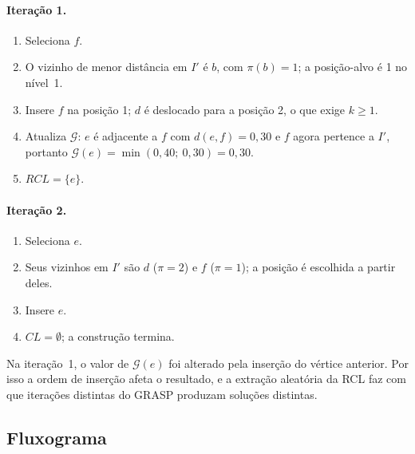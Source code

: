 \documentclass[12pt,a4paper]{article}
\begin{document}
\paragraph{Iteração 1.}
\begin{enumerate}
  \item Seleciona $f$.
  \item O vizinho de menor distância em $I'$ é $b$, com $\pi(b) = 1$; a
        posição-alvo é 1 no nível~1.
  \item Insere $f$ na posição 1; $d$ é deslocado para a posição 2, o que
        exige $k \ge 1$.
  \item Atualiza $\mathcal{G}$: $e$ é adjacente a $f$ com
        $d(e,f) = 0{,}30$ e $f$ agora pertence a $I'$, portanto
        $\mathcal{G}(e) = \min(0{,}40;\ 0{,}30) = 0{,}30$.
  \item $RCL = \{e\}$.
\end{enumerate}

\paragraph{Iteração 2.}
\begin{enumerate}
  \item Seleciona $e$.
  \item Seus vizinhos em $I'$ são $d$ ($\pi = 2$) e $f$ ($\pi = 1$); a
        posição é escolhida a partir deles.
  \item Insere $e$.
  \item $CL = \emptyset$; a construção termina.
\end{enumerate}

Na iteração~1, o valor de $\mathcal{G}(e)$ foi alterado pela inserção do
vértice anterior. Por isso a ordem de inserção afeta o resultado, e a
extração aleatória da RCL faz com que iterações distintas do GRASP
produzam soluções distintas.

\subsection{Fluxograma}
\end{document}
